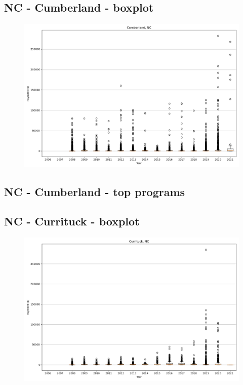\subsection*{NC - Cumberland - boxplot}
\begin{figure}[h]
\centering
\includegraphics[width=7in]{../output/boxplots/counties/Cumberland-NC_boxplot.png}
\end{figure}


\subsection*{NC - Cumberland - top programs}

\newpage
\subsection*{NC - Currituck - boxplot}
\begin{figure}[h]
\centering
\includegraphics[width=7in]{../output/boxplots/counties/Currituck-NC_boxplot.png}
\end{figure}


